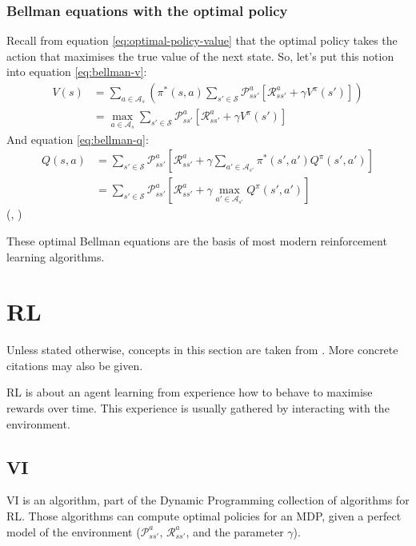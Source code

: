 \subsubsection{Bellman equations with the optimal policy}
Recall from equation \ref{eq:optimal-policy-value} that the optimal policy takes
the action that maximises the true value of the next state. So, let's put this
notion into equation \ref{eq:bellman-v}:
\begin{equation}
  \begin{split}
  V(s) &= \sum_{a\in\mathcal{A}_s} \left( \pi^*(s, a)
    \sum_{s' \in \mathcal{S}}\mathcal{P}^a_{ss'}
    \left[\mathcal{R}^a_{ss'} + \gamma V^\pi(s') \right] \right) \\
  &= \max_{a\in\mathcal{A}_s}\sum_{s' \in \mathcal{S}}\mathcal{P}^a_{ss'}
\left[\mathcal{R}^a_{ss'} + \gamma V^\pi(s') \right]
  \end{split}
\label{eq:bellman-v-optimal}
\end{equation}
And equation \ref{eq:bellman-q}:
\begin{equation}
  \begin{split}
  Q(s, a) &= \sum_{s' \in \mathcal{S}}\mathcal{P}^a_{ss'}
    \left[\mathcal{R}^a_{ss'} + \gamma \sum_{a'\in\mathcal{A}_{s'}}\pi^*(s', a')Q^\pi(s', a') \right] \\
  &= \sum_{s' \in \mathcal{S}}\mathcal{P}^a_{ss'}
    \left[\mathcal{R}^a_{ss'} + \gamma \max_{a'\in\mathcal{A}_{s'}}Q^\pi(s', a') \right]
  \end{split}
\label{eq:bellman-q-optimal}
  \end{equation}
(\cite[Section~17.2.1]{russell2009aima}, \cite[Section~3.8]{sutton1998introduction})

These optimal Bellman equations are the basis of most modern reinforcement
learning algorithms.


\section{\acl{RL}}
Unless stated otherwise, concepts in this section are taken from
\cite{sutton1998introduction}. More concrete citations may also be given.

\acf{RL} is about an agent learning from experience how to behave to maximise
rewards over time. This experience is usually gathered by interacting with the
environment.

\subsection{\acl{VI}}
\acf{VI} is an algorithm, part of the Dynamic Programming collection of
algorithms for \ac{RL}. Those algorithms can compute optimal policies for an
\ac{MDP}, given a perfect model of the environment ($\mathcal{P}^a_{ss'}$,
$\mathcal{R}^a_{ss'}$, and the parameter $\gamma$).

